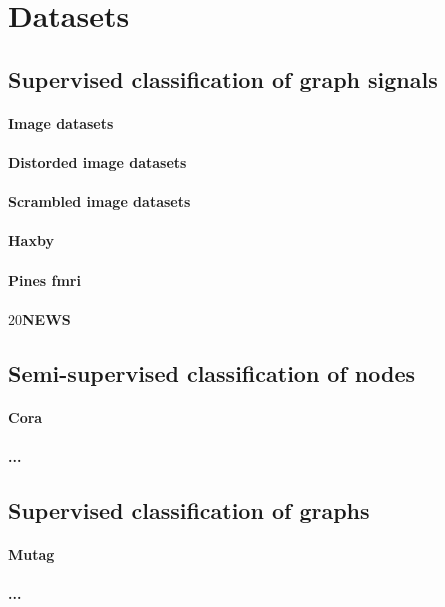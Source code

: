\section{Datasets}

\subsection{Supervised classification of graph signals}

\paragraph{Image datasets}

\paragraph{Distorded image datasets}

\paragraph{Scrambled image datasets}

\paragraph{Haxby}

\paragraph{Pines fmri}

\paragraph{$20$NEWS}

\subsection{Semi-supervised classification of nodes}

\paragraph{Cora}

\paragraph{...}

\subsection{Supervised classification of graphs}

\paragraph{Mutag}

\paragraph{...}


